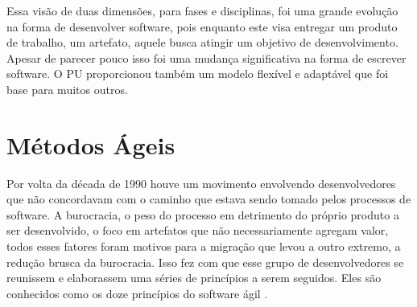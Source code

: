 \documentclass[
	article,			%
	11pt,				%
	oneside,			%
	a4paper,			%
	english,			%
	brazil,				%
	sumario=tradicional
	]{abntex2}
\begin{document}
Essa visão de duas dimensões, para fases e disciplinas, foi uma grande evolução
na forma de desenvolver software, pois enquanto este visa entregar um produto de
trabalho, um artefato, aquele busca atingir um objetivo de desenvolvimento.
Apesar de parecer pouco isso foi uma mudança significativa na forma de escrever
software. O PU proporcionou também um modelo flexível e adaptável que foi base
para muitos outros.

\section{Métodos Ágeis}

\label{metodos-ageis}

Por volta da década de 1990 houve um movimento envolvendo desenvolvedores que
não concordavam com o caminho que estava sendo tomado pelos processos de
software. A burocracia, o peso do processo em detrimento do próprio produto a
ser desenvolvido, o foco em artefatos que não necessariamente agregam valor,
todos esses fatores foram motivos para a migração que levou a outro extremo, a
redução brusca da burocracia. Isso fez com que esse grupo de desenvolvedores
se reunissem e elaborassem uma séries de princípios a serem seguidos. Eles são
conhecidos como os doze princípios do software ágil \cite{agilemanifesto}.
\end{document}
